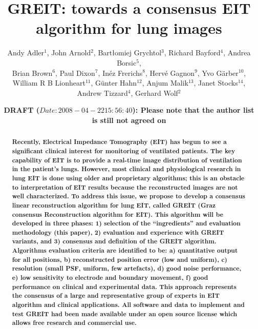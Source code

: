 \documentclass[letterpaper,twocolumn,10pt]{article}
\begin{document}
\title{\bf GREIT: towards a consensus EIT algorithm for lung images}

\author{Andy Adler$^{1}$,
        John Arnold$^{2}$,
        Bart\l{}omiej Grychtol$^{3}$, 
        Richard Bayford$^{4}$,
        Andrea Borsic$^{5}$,
\\
        Brian Brown$^{6}$,
        Paul Dixon$^{7}$,
        In\'ez Frerichs$^{8}$,
        Herv\'e Gagnon$^{9}$,
        Yvo G\"arber$^{10}$,
\\
        William R B Lionheart$^{11}$,
        G\"unter Hahn$^{12}$,
        Anjum Malik$^{13}$,
        Janet Stocks$^{14}$,
        Andrew Tizzard$^{4}$,
        Gerhard Wolf$^{2}$
       }

\date{\bf DRAFT ($Date: 2008-04-22 15:56:40 $): Please note that the
           author list is still not agreed on}
\maketitle

\begin{abstract}
\small \bf
Recently, Electrical Impedance Tomography (EIT) has begun to see a
significant clinical interest for monitoring of
ventilated patients.  The key capability of EIT is to
provide a real-time image distribution of ventilation in
the patient's lungs.
However, most clinical and physiological research in lung EIT
is done using older and proprietary algorithms; this is
an obstacle to interpretation of EIT results because the
reconstructed images are not well characterized.
To address this issue, we propose to develop a 
consensus linear reconstruction algorithm for lung EIT,
called GREIT (Graz consensus Reconstruction algorithm for EIT).
This algorithm will be developed in three phases:
1) selection of the ``ingredients'' and evaluation 
methodology (this paper),
2) evaluation and experience with GREIT variants, and
3) consensus and definition of the GREIT algorithm.
Algorithms evaluation criteria are identified to be:
a) quantitative output for all positions,
b) reconstructed position error (low and uniform),
c) resolution (small PSF, uniform, few artefacts),
d) good noise performance,
e) low sensitivity to electrode and boundary movement,
f) good performance on clinical and experimental data.
This approach represents the consensus of a large and representative
group of experts in EIT algorithm and clinical applications.
All software and data to implement and test GREIT had been
made available under an open source license which allows free
research and commercial use.
\end{abstract}
\end{document}
